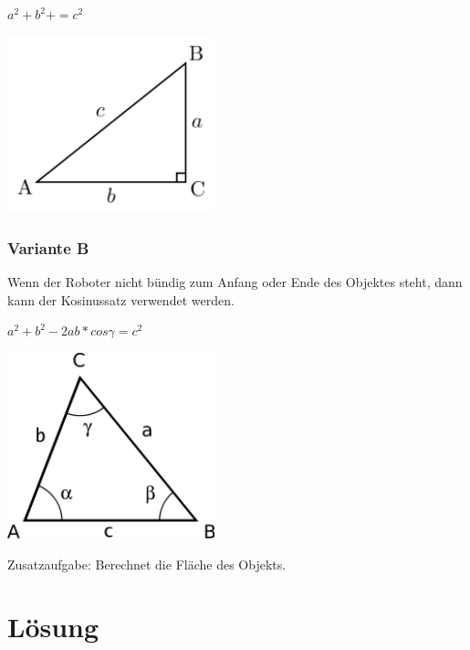 $a^2 + b^2 + = c^2$

\begin{capfigure}[Pythagoras]
	\includegraphics[width=6cm]{images/pythagoras.png}
\end{capfigure}

\clearpage
\subsubsection{Variante B}
Wenn der Roboter nicht bündig zum Anfang oder Ende des Objektes steht, dann kann der Kosinussatz verwendet werden.

$a^2 + b^2 - 2ab*cos\gamma = c^2$

\begin{capfigure}[Kosinussatz]
	\includegraphics[width=6cm]{images/kosinus.png}
\end{capfigure}

Zusatzaufgabe: Berechnet die Fläche des Objekts.

\section{Lösung}